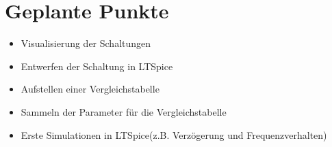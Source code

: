 \section{Geplante Punkte}


\begin{itemize}
  \item Visualisierung der Schaltungen
  \item Entwerfen der Schaltung in LTSpice
  \item Aufstellen einer Vergleichstabelle
  \item Sammeln der Parameter für die Vergleichstabelle
  \item Erste Simulationen in LTSpice(z.B. Verzögerung und Frequenzverhalten)
\end{itemize}

